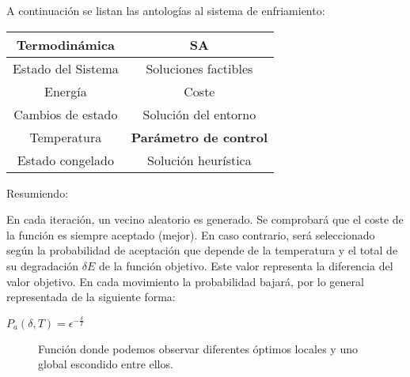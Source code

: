 \documentclass{llncs}
\begin{document}
A continuaci\'{o}n se listan las antolog\'{i}as al sistema de enfriamiento:\\

\begin{center}
\begin{tabular}{  c  c   }
  \hline
  Termodin\'{a}mica & SA\\ 
	\hline
  Estado del Sistema & Soluciones factibles \\
  Energ\'{i}a & Coste\\
  Cambios de estado & Soluci\'{o}n del entorno\\
  Temperatura & \textbf{Par\'{a}metro de control} \\
  Estado congelado & Soluci\'{o}n heur\'{i}stica\\
\end{tabular}
\end{center}

Resumiendo:

En cada iteraci\'{o}n, un vecino aleatorio es generado. Se comprobar\'{a} que el coste de la funci\'{o}n es siempre aceptado (mejor). En caso contrario, ser\'{a} seleccionado seg\'{u}n la probabilidad de aceptaci\'{o}n que depende de la temperatura y el total de su degradaci\'{o}n $\delta E$ de la funci\'{o}n objetivo. Este valor representa la diferencia del valor objetivo. En cada movimiento la probabilidad bajar\'{a}, por lo general representada de la siguiente forma:\\
\begin{center}
$P_a(\delta, T) = \epsilon^{-\frac{\delta}{T}}$
\end{center}

\begin{figure}
\begin{center}
\label{fig:Maximal3D}
\caption{Funci\'{o}n donde podemos observar diferentes \'{o}ptimos locales y uno global escondido entre ellos.}
\end{center}
\end{figure}
\end{document}
